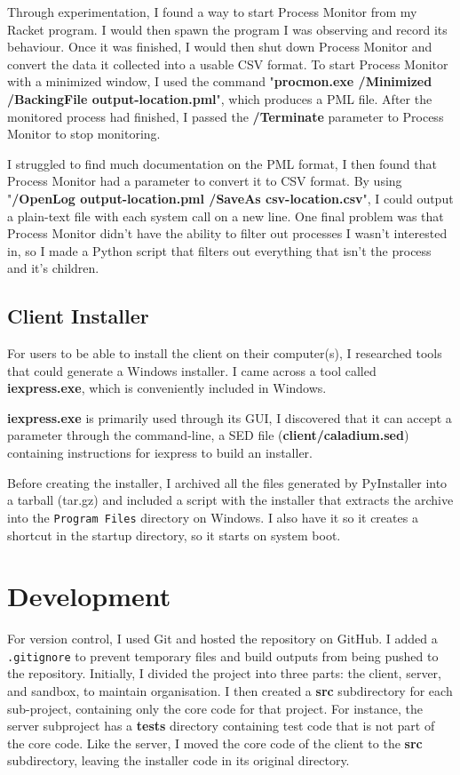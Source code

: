 Through experimentation, I found a way to start
Process Monitor from my Racket program.
I would then spawn the program I was observing and record its behaviour.
Once it was finished, I would then shut down Process Monitor
and convert the data it collected into a usable CSV format.
To start Process Monitor with a minimized window,
I used the command
"\textbf{procmon.exe /Minimized /BackingFile output-location.pml}",
which produces a PML file. After the monitored process had finished,
I passed the \textbf{/Terminate} parameter to Process Monitor to stop monitoring.

I struggled to find much documentation on the PML format,
I then found that Process Monitor had a parameter to convert it to CSV format.
By using "\textbf{/OpenLog output-location.pml /SaveAs csv-location.csv}",
I could output a plain-text file with each system call on a new line.
One final problem was that Process Monitor didn't have the ability
to filter out processes I wasn't interested in,
so I made a Python script that filters out everything that
isn't the process and it's children.

\subsection{Client Installer}
For users to be able to install the client on their computer(s),
I researched tools that could generate a Windows installer.
I came across a tool called \textbf{iexpress.exe},
which is conveniently included in Windows.

\textbf{iexpress.exe} is primarily used through its GUI,
I discovered that it can accept a parameter through the command-line,
a SED file (\textbf{client/caladium.sed})
containing instructions for iexpress to build an installer.

Before creating the installer,
I archived all the files generated by PyInstaller into a tarball (tar.gz)
and included a script with the installer that
extracts the archive into the \texttt{Program Files} directory on Windows.
I also have it so it creates a shortcut in the startup directory,
so it starts on system boot.

\section{Development}
For version control, I used Git and hosted the repository on GitHub.
I added a \texttt{.gitignore} to prevent temporary files
and build outputs from being pushed to the repository.
Initially, I divided the project into
three parts: the client, server, and sandbox,
to maintain organisation. I then created a \textbf{src} subdirectory
for each sub-project, containing only the core code for that project.
For instance, the server subproject has a \textbf{tests} directory
containing test code that is not part of the core code.
Like the server, I moved the core code of the client to the
\textbf{src} subdirectory, leaving
the installer code in its original directory.

